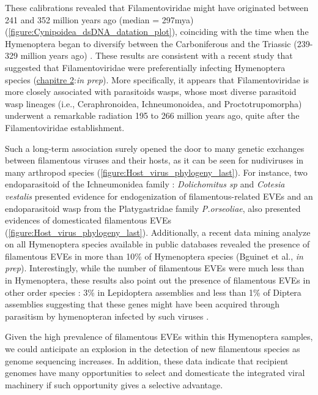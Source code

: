 These calibrations revealed that Filamentoviridae might have originated between 241 and 352 million years ago (median = 297mya)(\figurename{\ref{figure:Cynipoidea_dsDNA_datation_plot}}), coinciding with the time when the Hymenoptera began to diversify between the Carboniferous and the Triassic (239-329 million years ago) \citep{peters_evolutionary_2017}. These results are consistent with a recent study that suggested that Filamentoviridae were preferentially infecting Hymenoptera species (\hyperref[sec:chap2]{chapitre 2}:\textit{in prep}).   More specifically, it appears that Filamentoviridae is more closely associated with parasitoids wasps, whose most diverse parasitoid wasp lineages (i.e., Ceraphronoidea, Ichneumonoidea, and Proctotrupomorpha) underwent a remarkable radiation 195 to 266 million years ago, quite after the Filamentoviridae establishment. 

Such a long-term association surely opened the door to many genetic exchanges between filamentous viruses and their hosts, as it can be seen for nudiviruses in many arthropod species (\figurename{\ref{figure:Host_virus_phylogeny_last}}). For instance, two endoparasitoid of the Ichneumonidea family : \textit{Dolichomitus sp} and \textit{Cotesia vestalis} \citep{burke_endogenization_2020} presented evidence for endogenization of filamentous-related EVEs and an endoparasitoid wasp from the Platygastridae family \textit{P.orseoliae}, also presented evidences of domesticated filamentous EVEs (\figurename{\ref{figure:Host_virus_phylogeny_last}}). Additionally, a recent data mining analyze on all Hymenoptera species available in public databases revealed the presence of filamentous EVEs in more than 10\% of Hymenoptera species (Bguinet et al., \textit{in prep}). Interestingly, while the number of filamentous EVEs were much less than in Hymenoptera, these results also point out the presence of filamentous EVEs in other order species : 3\% in Lepidoptera assemblies and less than 1\% of Diptera assemblies suggesting that these genes might have been acquired through parasitism by hymenopteran infected by such viruses \citep{muller_genome-wide_2021}. 

Given the high prevalence of filamentous EVEs within this Hymenoptera samples, we could anticipate an explosion in the detection of new filamentous species as genome sequencing increases. In addition, these data indicate that recipient genomes have many opportunities to select and domesticate the integrated viral machinery if such opportunity gives a selective advantage. 



